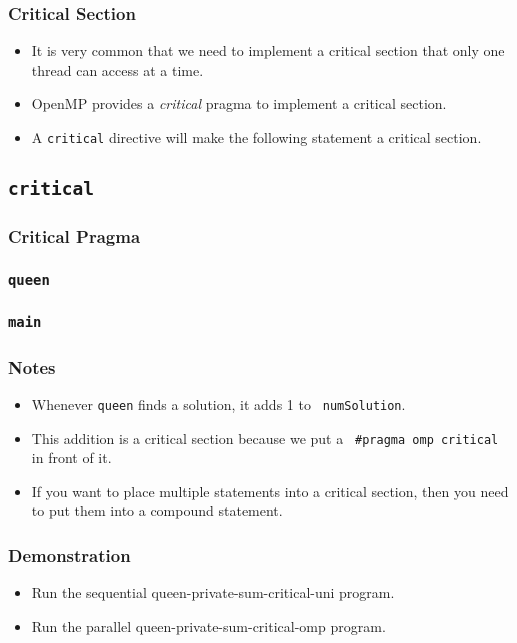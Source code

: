 \documentclass{beamer}
\begin{document}
\begin{frame}
  \frametitle{Critical Section}
  \begin{itemize}
  \item It is very common that we need to implement a critical section
    that only one thread can access at a time.
  \item OpenMP provides a {\em critical} pragma to implement a critical
    section.  
  \item A {\tt critical} directive will make the following statement a
    critical section.
  \end{itemize}
\end{frame}

\subsection{\tt critical}

\begin{frame}
  \frametitle{Critical Pragma} 
\end{frame}


\begin{frame}
\frametitle{\tt queen}
\end{frame}

\begin{frame}
\frametitle{\tt main}
\end{frame}

\begin{frame}
\frametitle{Notes}
\begin{itemize}
\item Whenever {\tt queen} finds a solution, it adds 1 to {\tt
  numSolution}.
\item This addition is a critical section because we put a {\tt
  \#pragma omp critical} in front of it.
\item If you want to place multiple statements into a critical
  section, then you need to put them into a compound statement.
\end{itemize}
\end{frame}

\begin{frame}
\frametitle{Demonstration}
\begin{itemize}
\item Run the sequential queen-private-sum-critical-uni program.
\item Run the parallel queen-private-sum-critical-omp program.
\end{itemize}
\end{frame}
\end{document}
